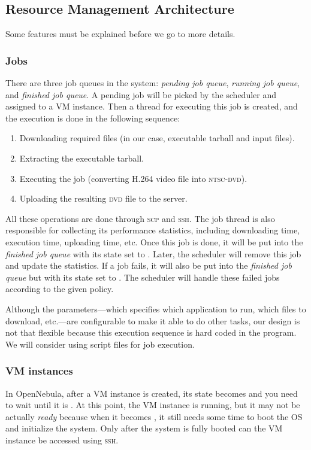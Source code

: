 \subsection{Resource Management Architecture}
Some features must be explained before we go to more details.

\subsubsection{Jobs}
There are three job queues in the system: \emph{pending job queue},
\emph{running job queue}, and \emph{finished job queue}. A pending job
will be picked by the scheduler and assigned to a VM instance. Then a
thread for executing this job is created, and the execution is done in
the following sequence:

\begin{enumerate}
\item Downloading required files (in our case, executable tarball and
  input files).
\item Extracting the executable tarball.
\item Executing the job (converting H.264 video file into
  \textsc{ntsc-dvd}).
\item Uploading the resulting \textsc{dvd} file to the server.
\end{enumerate}

All these operations are done through \textsc{scp} and \textsc{ssh}.
The job thread is also responsible for collecting its performance
statistics, including downloading time, execution time, uploading
time, etc. Once this job is done, it will be put into the
\emph{finished job queue} with its state set to \statefinished. Later,
the scheduler will remove this job and update the statistics. If a job
fails, it will also be put into the \emph{finished job queue} but with
its state set to \statefailed.  The scheduler will handle these failed
jobs according to the given policy.

Although the parameters---which specifies which application to run, which
files to download, etc.---are configurable to make it able to do other
tasks, our design is not that flexible because this execution sequence
is hard coded in the program. We will consider using script files for job
execution.


\subsubsection{VM instances}
In OpenNebula, after a VM instance is created, its state becomes
\statepending and you need to wait until it is \staterunning.
At this point, the VM instance is running, but it may not be actually
\emph{ready} because when it becomes \staterunning, it still needs some
time to boot the OS and initialize the system. Only after the system is
fully booted can the VM instance be accessed using \textsc{ssh}.

